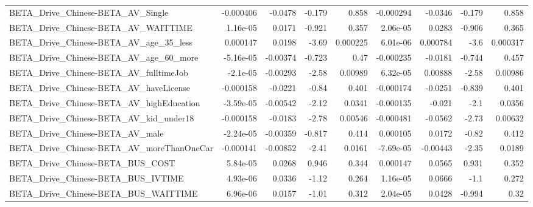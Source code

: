 \begin{tabular}{lrrrrrrrr}
BETA\_Drive\_Chinese-BETA\_AV\_Single                  &   -0.000406 &      -0.0478 &    -0.179 &    0.858 &  -0.000294 &     -0.0346 &       -0.179 &         0.858 \\
BETA\_Drive\_Chinese-BETA\_AV\_WAITTIME                &    1.16e-05 &       0.0171 &    -0.921 &    0.357 &   2.06e-05 &      0.0283 &       -0.906 &         0.365 \\
BETA\_Drive\_Chinese-BETA\_AV\_age\_35\_less             &    0.000147 &       0.0198 &     -3.69 & 0.000225 &   6.01e-06 &    0.000784 &         -3.6 &      0.000317 \\
BETA\_Drive\_Chinese-BETA\_AV\_age\_60\_more             &   -5.16e-05 &     -0.00374 &    -0.723 &     0.47 &  -0.000235 &     -0.0181 &       -0.744 &         0.457 \\
BETA\_Drive\_Chinese-BETA\_AV\_fulltimeJob             &    -2.1e-05 &     -0.00293 &     -2.58 &  0.00989 &   6.32e-05 &     0.00888 &        -2.58 &       0.00986 \\
BETA\_Drive\_Chinese-BETA\_AV\_haveLicense             &   -0.000158 &      -0.0221 &     -0.84 &    0.401 &  -0.000174 &     -0.0251 &       -0.839 &         0.401 \\
BETA\_Drive\_Chinese-BETA\_AV\_highEducation           &   -3.59e-05 &     -0.00542 &     -2.12 &   0.0341 &  -0.000135 &      -0.021 &         -2.1 &        0.0356 \\
BETA\_Drive\_Chinese-BETA\_AV\_kid\_under18             &   -0.000158 &      -0.0183 &     -2.78 &  0.00546 &  -0.000481 &     -0.0562 &        -2.73 &       0.00632 \\
BETA\_Drive\_Chinese-BETA\_AV\_male                    &   -2.24e-05 &     -0.00359 &    -0.817 &    0.414 &   0.000105 &      0.0172 &        -0.82 &         0.412 \\
BETA\_Drive\_Chinese-BETA\_AV\_moreThanOneCar          &   -0.000141 &     -0.00852 &     -2.41 &   0.0161 &  -7.69e-05 &    -0.00443 &        -2.35 &        0.0189 \\
BETA\_Drive\_Chinese-BETA\_BUS\_COST                   &    5.84e-05 &       0.0268 &     0.946 &    0.344 &   0.000147 &      0.0565 &        0.931 &         0.352 \\
BETA\_Drive\_Chinese-BETA\_BUS\_IVTIME                 &    4.93e-06 &       0.0336 &     -1.12 &    0.264 &   1.16e-05 &      0.0666 &         -1.1 &         0.272 \\
BETA\_Drive\_Chinese-BETA\_BUS\_WAITTIME               &    6.96e-06 &       0.0157 &     -1.01 &    0.312 &   2.04e-05 &      0.0428 &       -0.994 &          0.32 \\

\end{tabular}
